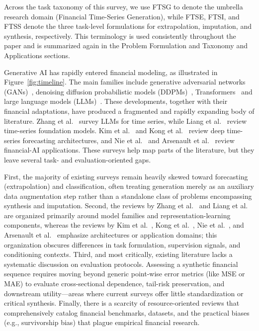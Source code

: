 \documentclass[11pt,a4paper]{article}
\begin{document}
Across the task taxonomy of this survey, we use FTSG to denote the umbrella research domain (Financial Time-Series Generation), while FTSE, FTSI, and FTSS denote the three task-level formulations for extrapolation, imputation, and synthesis, respectively. This terminology is used consistently throughout the paper and is summarized again in the Problem Formulation and Taxonomy and Applications sections.

Generative AI has rapidly entered financial modeling, as illustrated in Figure~\ref{fig:timeline}. The main families include generative adversarial networks (GANs)~\citep{goodfellow2014gan,Time-GAN,wiese2020,naritomi2020data}, denoising diffusion probabilistic models (DDPMs)~\citep{ho2020ddpm,rasul2021timegrad}, Transformers~\citep{vaswani2017attention} and large language models (LLMs)~\citep{brown2020language,jin2024timellm,ansari2024chronos}. These developments, together with their financial adaptations, have produced a fragmented and rapidly expanding body of literature. Zhang et al.~\citep{Survey1} survey LLMs for time series, while Liang et al.~\citep{Survey2} review time-series foundation models. Kim et al.~\citep{Survey3} and Kong et al.~\citep{Survey4} review deep time-series forecasting architectures, and Nie et al.~\citep{FinSurvey1} and Arsenault et al.~\citep{FinSurvey3} review financial-AI applications. These surveys help map parts of the literature, but they leave several task- and evaluation-oriented gaps.

First, the majority of existing surveys remain heavily skewed toward forecasting (extrapolation) and classification, often treating generation merely as an auxiliary data augmentation step rather than a standalone class of problems encompassing synthesis and imputation. Second, the reviews by Zhang et al.~\citep{Survey1} and Liang et al.~\citep{Survey2} are organized primarily around model families and representation-learning components, whereas the reviews by Kim et al.~\citep{Survey3}, Kong et al.~\citep{Survey4}, Nie et al.~\citep{FinSurvey1}, and Arsenault et al.~\citep{FinSurvey3} emphasize architectures or application domains; this organization obscures differences in task formulation, supervision signals, and conditioning contexts. Third, and most critically, existing literature lacks a systematic discussion on evaluation protocols. Assessing a synthetic financial sequence requires moving beyond generic point-wise error metrics (like MSE or MAE) to evaluate cross-sectional dependence, tail-risk preservation, and downstream utility---areas where current surveys offer little standardization or critical synthesis. Finally, there is a scarcity of resource-oriented reviews that comprehensively catalog financial benchmarks, datasets, and the practical biases (e.g., survivorship bias) that plague empirical financial research.
\end{document}
